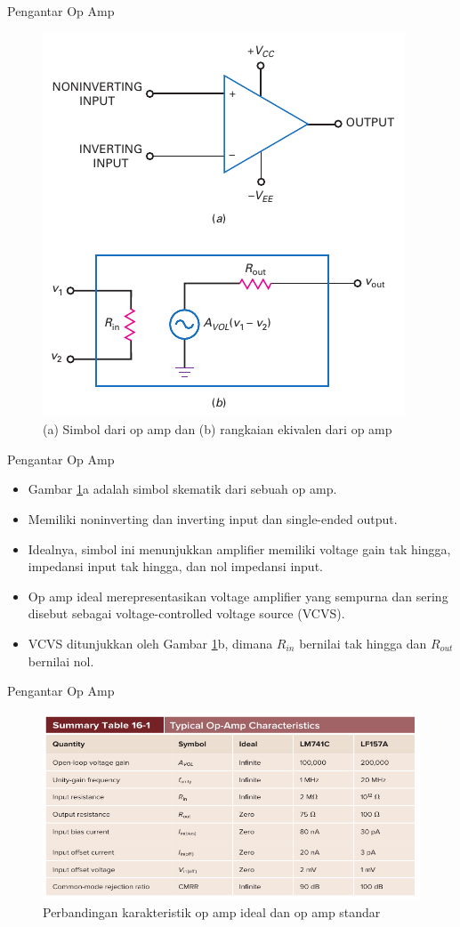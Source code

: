 \begin{frame}{Pengantar Op Amp}
	\begin{figure}
		\centering
		\includegraphics[width=0.4\linewidth]{gambar/fig-16.02}
		\caption{(a) Simbol dari op amp dan (b) rangkaian ekivalen dari op amp}
		\label{fig-16.02}
	\end{figure}
\end{frame}

\begin{frame}{Pengantar Op Amp}
	\begin{itemize}
		\item Gambar \ref{fig-16.02}a adalah simbol skematik dari sebuah op amp.
		\item Memiliki noninverting dan inverting input dan single-ended output.
		\item Idealnya, simbol ini menunjukkan amplifier memiliki voltage gain tak hingga, impedansi input tak hingga, dan nol impedansi input.
		\item Op amp ideal merepresentasikan voltage amplifier yang sempurna dan sering disebut sebagai voltage-controlled voltage source (VCVS).
		\item VCVS ditunjukkan oleh Gambar \ref{fig-16.02}b, dimana $ R_{in} $ bernilai tak hingga dan $ R_{out} $ bernilai nol.
	\end{itemize}
\end{frame}

\begin{frame}{Pengantar Op Amp}
	\begin{figure}
		\centering
		\includegraphics[width=0.8\linewidth]{gambar/tab-16.01}
		\caption{Perbandingan karakteristik op amp ideal dan op amp standar}
		\label{tab-16.01}
	\end{figure}
\end{frame}

